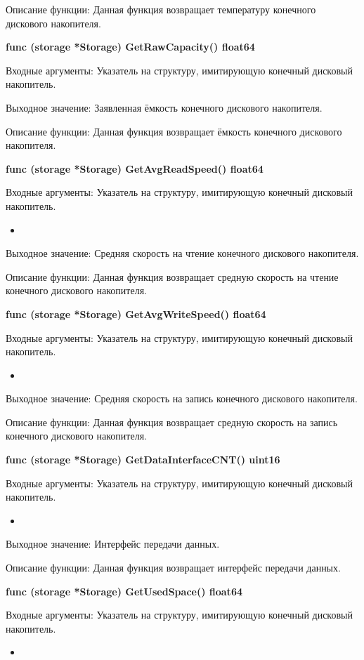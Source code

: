 Описание функции: Данная функция возвращает температуру конечного дискового накопителя.

\textbf{func (storage *Storage) GetRawCapacity() float64}

Входные аргументы: Указатель на структуру, имитирующую конечный дисковый накопитель.

Выходное значение: Заявленная ёмкость конечного дискового накопителя.

Описание функции: Данная функция возвращает ёмкость конечного дискового накопителя.

\textbf{func (storage *Storage) GetAvgReadSpeed() float64}

Входные аргументы: Указатель на структуру, имитирующую конечный дисковый накопитель.
\begin{itemize}
	\item 
\end{itemize}

Выходное значение: Средняя скорость на чтение конечного дискового накопителя.

Описание функции: Данная функция возвращает средную скорость на чтение конечного дискового накопителя.

\textbf{func (storage *Storage) GetAvgWriteSpeed() float64}

Входные аргументы: Указатель на структуру, имитирующую конечный дисковый накопитель.
\begin{itemize}
	\item 
\end{itemize}

Выходное значение: Средняя скорость на запись конечного дискового накопителя.

Описание функции: Данная функция возвращает средную скорость на запись конечного дискового накопителя.


\textbf{func (storage *Storage) GetDataInterfaceCNT() uint16}

Входные аргументы: Указатель на структуру, имитирующую конечный дисковый накопитель.
\begin{itemize}
	\item 
\end{itemize}

Выходное значение: Интерфейс передачи данных. 

Описание функции: Данная функция возвращает интерфейс передачи данных.

\textbf{func (storage *Storage) GetUsedSpace() float64 }

Входные аргументы: Указатель на структуру, имитирующую конечный дисковый накопитель.
\begin{itemize}
	\item 
\end{itemize}

